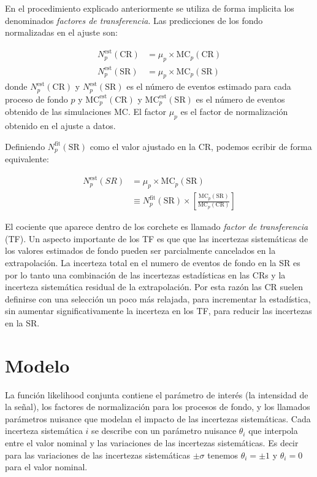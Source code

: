 En el procedimiento explicado anteriormente se utiliza de forma implicita los denominados
\emph{factores de transferencia}. Las predicciones de los fondo normalizadas en el ajuste son:

\begin{align}
  N_p^{\text{est}}(\text{CR}) &= \mu_p \times \text{MC}_p (\text{CR}) \\
  N_p^{\text{est}}(\text{SR}) &= \mu_p \times \text{MC}_p (\text{SR})
\end{align}
%
donde $N_p^{\text{est}}(\text{CR})$ y $N_p^{\text{est}}(\text{SR})$ es el número de eventos
estimado para cada proceso de fondo $p$ y $\text{MC}_p^{\text{est}}(\text{CR})$ y $\text{MC}_p^{\text{est}}(\text{SR})$
es el número de eventos obtenido de las simulaciones MC. El factor $\mu_p$
es el factor de normalización obtenido en el ajuste a datos.


Definiendo $N_p^\text{fit}(\text{SR})$ como el valor ajustado en la CR,
podemos ecribir de forma equivalente:

\begin{align}
  N_p^\text{est}(SR) &= \mu_p \times \text{MC}_p (\text{SR}) \nonumber \\
  &\equiv N_p^\text{fit}(\text{SR}) \times \left[ \frac{\text{MC}_p(\text{SR})}{\text{MC}_p(\text{CR})} \right]
\end{align}

El cociente que aparece dentro de los corchete es llamado \emph{factor de transferencia} (TF).
Un aspecto importante de los TF es que que las incertezas sistemáticas de los
valores estimados de fondo pueden ser parcialmente cancelados en la extrapolación.
La incerteza total en el numero de eventos de fondo en la SR es por lo tanto
una combinación de las incertezas estadísticas en las CRs y la incerteza sistemática
residual de la extrapolación. Por esta razón las CR suelen definirse con una selección
un poco más relajada, para incrementar la estadística, sin aumentar significativamente
la incerteza en los TF, para reducir las incertezas en la SR.

\section{Modelo}

La función likelihood conjunta contiene el parámetro de interés (la intensidad de la señal),
los factores de normalización para los procesos de fondo, y los llamados parámetros nuisance que modelan
el impacto de las incertezas sistemáticas. Cada incerteza sistemática $i$ se describe con
un parámetro nuisance $\theta_i$ que interpola entre el valor nominal y las variaciones
de las incertezas sistemáticas. Es decir para las variaciones de las incertezas sistemáticas
$\pm \sigma$ tenemos $\theta_i = \pm 1$ y $\theta_i = 0$ para el valor nominal.

